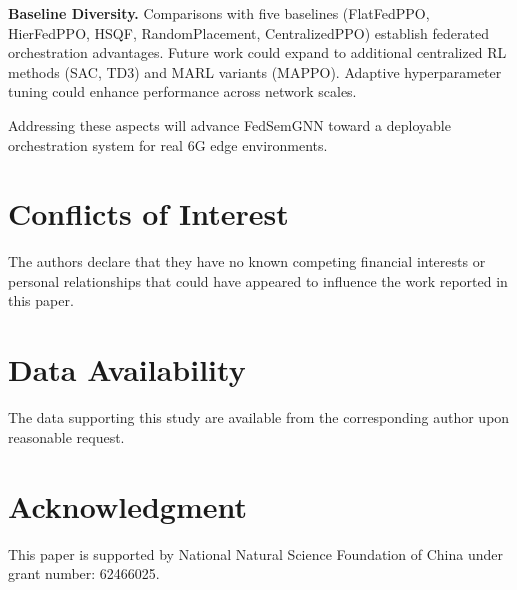 \documentclass[conference]{IEEEtran}
\begin{document}
	\textbf{Baseline Diversity.} Comparisons with five baselines (FlatFedPPO, HierFedPPO, HSQF, RandomPlacement, CentralizedPPO) establish federated orchestration advantages. Future work could expand to additional centralized RL methods (SAC, TD3) and MARL variants (MAPPO). Adaptive hyperparameter tuning could enhance performance across network scales.
	
	Addressing these aspects will advance FedSemGNN toward a deployable orchestration system for real 6G edge environments.
	
	
	
	\section*{Conflicts of Interest}
	The authors declare that they have no known competing financial interests or personal relationships that could have appeared to influence the work reported in this paper.
	
	\section*{Data Availability}
	The data supporting this study are available from the corresponding author upon reasonable request.
	
	\section*{Acknowledgment}
	\textcolor{revblue}{This paper is supported by National Natural Science Foundation of China under grant number: 62466025.}
	
	
	
	
	
\end{document}
